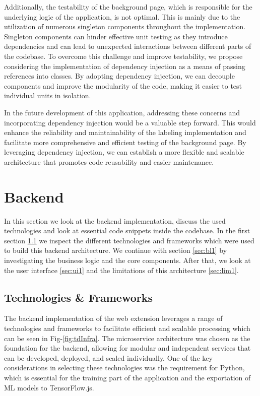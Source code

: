 Additionally, the testability of the background page, which is responsible for the underlying logic of the application,
is not optimal. This is mainly due to the utilization of numerous singleton components throughout the implementation.
Singleton components can hinder effective unit testing as they introduce dependencies and can lead to unexpected interactions
between different parts of the codebase. To overcome this challenge and improve testability, we propose considering the
implementation of dependency injection as a means of passing references into classes. By adopting dependency injection, we
can decouple components and improve the modularity of the code, making it easier to test individual units in isolation.

In the future development of this application, addressing these concerns and incorporating dependency injection would
be a valuable step forward. This would enhance the reliability and maintainability of the labeling implementation
and facilitate more comprehensive and efficient testing of the background page. By leveraging dependency injection,
we can establish a more flexible and scalable architecture that promotes code reusability and easier maintenance.

\section{Backend}
In this section we look at the backend implementation, discuss the used technologies and look at essential code
snippets inside the codebase. In the first section \ref{sec:techframe} we inspect the different technologies and frameworks 
which were used to build this backend architecture. We continue with section \ref{sec:bl1} by investigating the
business logic and the core components. After that, we look at the user interface \ref{sec:ui1} and the limitations of this architecture \ref{sec:lim1}. 
\subsection{Technologies \& Frameworks}
\label{sec:techframe}
The backend implementation of the web extension leverages a range of technologies and frameworks to facilitate efficient and scalable
processing which can be seen in Fig-\ref{fig:tdInfra}. The microservice architecture was chosen as the foundation for the backend, allowing for modular and independent services
that can be developed, deployed, and scaled individually. One of the key considerations in selecting these technologies was the
requirement for Python, which is essential for the training part of the application and the exportation of ML models
to TensorFlow.js.

